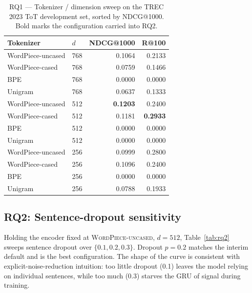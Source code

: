 \documentclass[conference]{IEEEtran}
\begin{document}
\begin{table}[t]
\centering
\caption{RQ1 — Tokenizer / dimension sweep on the TREC 2023 ToT
development set, sorted by NDCG@1000. Bold marks the configuration
carried into RQ2.}
\label{tab:rq1}
\begin{tabular}{llrr}
\toprule
Tokenizer & $d$ & NDCG@1000 & R@100 \\
\midrule
WordPiece-uncased          & 768          & 0.1064          & 0.2133          \\
WordPiece-cased            & 768          & 0.0759          & 0.1466          \\
BPE                        & 768          & 0.0000          & 0.0000          \\
Unigram                    & 768          & 0.0637          & 0.1333        \\

WordPiece-uncased          & 512          & \textbf{0.1203} & 0.2400          \\
WordPiece-cased            & 512          & 0.1181          & \textbf{0.2933} \\
BPE                        & 512          & 0.0000          & 0.0000          \\
Unigram                    & 512          & 0.0000          & 0.0000          \\

WordPiece-uncased          & 256          & 0.0999          & 0.2800          \\
WordPiece-cased            & 256          & 0.1096          & 0.2400         \\
BPE                        & 256          & 0.0000          & 0.0000          \\
Unigram                    & 256          & 0.0788          & 0.1933          \\
\bottomrule
\end{tabular}
\end{table}

\subsection{RQ2: Sentence-dropout sensitivity}
Holding the encoder fixed at \textsc{WordPiece-uncased}, $d{=}512$, Table~\ref{tab:rq2}
sweeps sentence dropout over $\{0.1, 0.2, 0.3\}$. Dropout $p{=}0.2$
matches the interim default and is the best configuration. The shape of
the curve is consistent with explicit-noise-reduction intuition: too
little dropout (0.1) leaves the model relying on individual sentences,
while too much (0.3) starves the GRU of signal during training.
\end{document}
